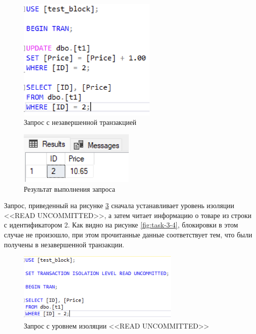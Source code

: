 \documentclass[a4paper, 14pt]{extarticle}
\begin{document}
\begin{figure}[H]
  \centering
  \includegraphics[width=0.6\textwidth]{images/task-3/1.png}
  \caption{Запрос с незавершенной транзакцией}
  \label{fig:task-3-1}
\end{figure}

\begin{figure}[H]
  \centering
  \includegraphics[width=0.5\textwidth]{images/task-3/2.png}
  \caption{Результат выполнения запроса}
  \label{fig:task-3-2}
\end{figure}

Запрос, приведенный на рисунке \ref{fig:task-3-3} сначала устанавливает уровень
изоляции <<\foreignlanguage{english}{READ UNCOMMITTED}>>, а затем читает
информацию о товаре из строки с идентификатором 2. Как видно на рисунке
\ref{fig:task-3-4}, блокировки в этом случае не произошло, при этом прочитанные
данные соответствует тем, что были получены в незавершенной транзакции.

\begin{figure}[H]
  \centering
  \includegraphics[width=0.7\textwidth]{images/task-3/3.png}
  \caption{
    Запрос с уровнем изоляции <<\foreignlanguage{english}{READ UNCOMMITTED}>>
  }
  \label{fig:task-3-3}
\end{figure}
\end{document}
